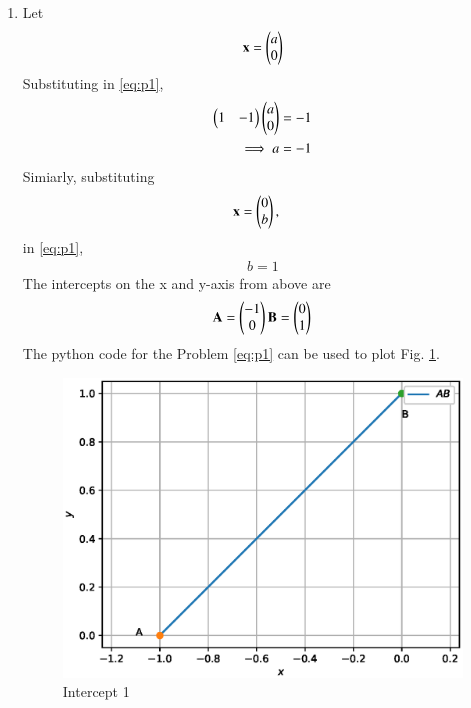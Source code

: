 \renewcommand{\theequation}{\theenumi}
\begin{enumerate}[label=\arabic*.,ref=\thesubsection.\theenumi]

\item Let 
\begin{align}
\mathbf{x} = \begin{pmatrix}a\\0\end{pmatrix}
\end{align}
%
Substituting in \eqref{eq:p1}, 
%
\begin{align}
\begin{pmatrix}1 & -1\end{pmatrix} \begin{pmatrix}a\\0\end{pmatrix}&= -1
\\
\implies a &=-1
\end{align}
%
Simiarly, substituting 
%
\begin{align}
\mathbf{x} &= \begin{pmatrix}0\\b\end{pmatrix},
\end{align}
%
in \eqref{eq:p1}, 
%
%
\begin{align}
b =1
\end{align}
%
The intercepts on the x and y-axis from above are 
\begin{align}
\mathbf{A} = \begin{pmatrix}-1\\0\end{pmatrix}
\mathbf{B} = \begin{pmatrix}0\\1\end{pmatrix}
\end{align}
The python code for the Problem \eqref{eq:p1}
%
can be used to plot Fig. \ref{fig:intercept1}.
%
\begin{figure}[!ht]
\includegraphics[width=\columnwidth]{./figs/triangle/icept1.eps}
\caption{Intercept 1}
\label{fig:intercept1}
\end{figure}


\end{enumerate}
